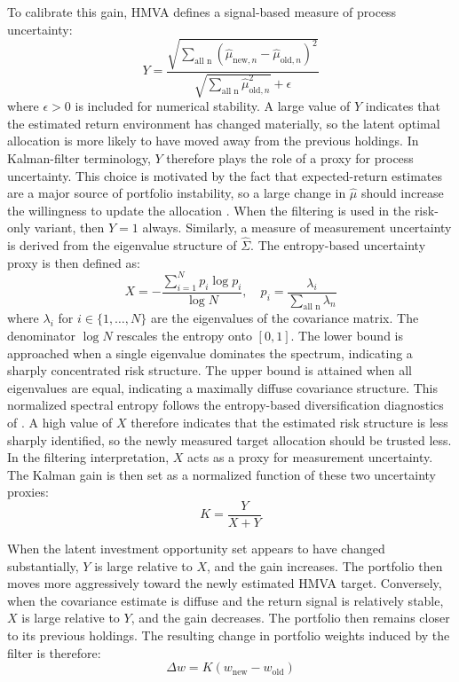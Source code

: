 \documentclass[12pt]{article}
\begin{document}
To calibrate this gain, HMVA defines a signal-based measure of process uncertainty:
\begin{equation}
Y =   \frac{ \sqrt{ \sum_{\text{all n}} \left( \hat{\mu}_{\text{new},n} - \hat{\mu}_{\text{old},n} \right)^2 } }{ \sqrt{ \sum_{\text{all n}}  \hat{\mu}_{\text{old},n} ^2 } + \epsilon }\label{eq:Y}
\end{equation}
where $\epsilon > 0$ is included for numerical stability. A large value of $Y$ indicates that the estimated return environment has changed materially, so the latent optimal allocation is more likely to have moved away from the previous holdings. In Kalman-filter terminology, $Y$ therefore plays the role of a proxy for process uncertainty. This choice is motivated by the fact that expected-return estimates are a major source of portfolio instability, so a large change in $\hat{\mu}$ should increase the willingness to update the allocation \cite{chopraziemba1993}. When the filtering is used in the risk-only variant, then $Y=1$ always. Similarly, a measure of measurement uncertainty is derived from the eigenvalue structure of $\hat{\Sigma}$. The entropy-based uncertainty proxy is then defined as:
\begin{equation}
X = -\frac{ \sum_{i=1}^{N} p_i \log p_i }{ \log N }, \quad p_i = \frac{ \lambda_i }{ \sum_{\text{all n}} \lambda_n } \label{eq:X}
\end{equation}
where $\lambda_i$ for $i \in \{1,\dots,N\}$ are the eigenvalues of the covariance matrix. The denominator $\log N$ rescales the entropy onto $[0,1]$. The lower bound is approached when a single eigenvalue dominates the spectrum, indicating a sharply concentrated risk structure. The upper bound is attained when all eigenvalues are equal, indicating a maximally diffuse covariance structure. This normalized spectral entropy follows the entropy-based diversification diagnostics of \cite{meucci2009}. A high value of $X$ therefore indicates that the estimated risk structure is less sharply identified, so the newly measured target allocation should be trusted less. In the filtering interpretation, $X$ acts as a proxy for measurement uncertainty. The Kalman gain is then set as a normalized function of these two uncertainty proxies:
\begin{equation}
K = \frac{Y}{X+Y} \label{eq:gain}
\end{equation}

When the latent investment opportunity set appears to have changed substantially, $Y$ is large relative to $X$, and the gain increases. The portfolio then moves more aggressively toward the newly estimated HMVA target. Conversely, when the covariance estimate is diffuse and the return signal is relatively stable, $X$ is large relative to $Y$, and the gain decreases. The portfolio then remains closer to its previous holdings. The resulting change in portfolio weights induced by the filter is therefore:
\begin{equation}
\Delta w = K \left( w_{\mathrm{new}} - w_{\mathrm{old}} \right) \label{eq:turnover}
\end{equation}
\end{document}
